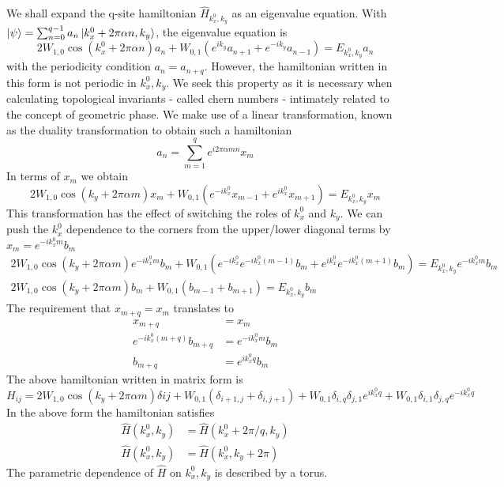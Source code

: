 We shall expand the q-site hamiltonian $\hat{H}_{k_x^0, k_y}$ as an eigenvalue equation. With $\ket{\psi} = \sum_{n=0}^{q-1}{a_n \ket{k_{x}^0 + 2\pi\alpha n, k_y}}$, the 
eigenvalue equation is
\begin{equation}
2W_{1,0} \cos(k_{x}^0 + 2\pi\alpha n) a_{n} + W_{0,1} (e^{ik_y} a_{n+1} + e^{-ik_y} a_{n-1}) = E_{k_{x}^0, k_y} a_n
\end{equation} with the periodicity condition $a_{n} = a_{n+q}$.
However, the hamiltonian written in this form is not periodic in $k_x^0 , k_y$. We seek this property as it is necessary when calculating topological invariants - called
chern numbers - intimately related to the concept of geometric phase. We make use of a linear transformation, known as the duality transformation \cite{aubry1980analyticity} to obtain such a hamiltonian
\begin{equation}
 a_{n} = \sum_{m=1}^{q} e^{i2\pi\alpha mn} x_{m}
\end{equation} In terms of $x_{m}$ we obtain
\begin{equation}
 2W_{1,0} \cos(k_y + 2\pi\alpha m)x_{m} + W_{0,1}(e^{-ik_{x}^0} x_{m-1} + e^{ik_{x}^0}x_{m+1}) = E_{k_{x}^0, k_y} x_{m}
\end{equation} This transformation has the effect of switching the roles of $k_{x}^0$ and $k_{y}$.
We can push the $k_{x}^0$ dependence to the corners from the upper/lower diagonal terms by $x_m = e^{-ik_{x}^0 m} b_{m}$
\begin{gather}
 2W_{1,0} \cos(k_y + 2\pi\alpha m)e^{-ik_{x}^0 m} b_{m} + W_{0,1}(e^{-ik_{x}^0} e^{-ik_{x}^0 (m-1)} b_{m} + e^{ik_{x}^0}e^{-ik_{x}^0 (m+1)} b_{m}) = E_{k_{x}^0, k_y} e^{-ik_{x}^0 m} b_{m} \nonumber \\
 2W_{1,0} \cos(k_y + 2\pi\alpha m)b_{m} + W_{0,1}(b_{m-1} + b_{m+1}) = E_{k_{x}^0, k_y} b_{m}
\end{gather}
The requirement that $x_{m+q} = x_{m}$ translates to
\begin{align}
 x_{m+q} &= x_{m} \nonumber \\
 e^{-ik_{x}^0 (m+q)} b_{m+q} &= e^{-ik_{x}^0 m} b_{m} \nonumber \\
 b_{m+q} &= e^{ik_{x}^0 q} b_{m}
\end{align}
The above hamiltonian written in matrix form is
\begin{equation}
H_{ij} = 2W_{1,0} \cos(k_y + 2\pi\alpha m) \delta{ij} + W_{0,1} (\delta_{i+1, j} + \delta_{i, j+1}) + W_{0,1}\delta_{i,q}\delta_{j,1} e^{ik_{x}^0 q} + W_{0,1}\delta_{i,1}\delta_{j,q} e^{-ik_{x}^0 q}
\end{equation}
In the above form the hamiltonian satisfies
\begin{align}
 \hat{H}(k_{x}^0, k_y) &= \hat{H}(k_{x}^0 + 2\pi/q, k_y) \\
 \hat{H}(k_{x}^0, k_y) &= \hat{H}(k_{x}^0, k_y+2\pi)
\end{align} The parametric dependence of $\hat{H}$ on $k_x^0 , k_y$ is described by a torus.

